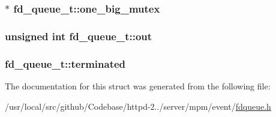 \subsubsection[{\texorpdfstring{one\+\_\+big\+\_\+mutex}{one_big_mutex}}]{ $\ast$ fd\+\_\+queue\+\_\+t\+::one\+\_\+big\+\_\+mutex}\hypertarget{structfd__queue__t_af029904f6cc5ddc0afec5df2fadeaef6}{}\label{structfd__queue__t_af029904f6cc5ddc0afec5df2fadeaef6}
\subsubsection[{\texorpdfstring{out}{out}}]{\setlength{\rightskip}{0pt plus 5cm}unsigned {\bf int} fd\+\_\+queue\+\_\+t\+::out}\hypertarget{structfd__queue__t_a85b9339d9c70a03d3ff95ae92061cf70}{}\label{structfd__queue__t_a85b9339d9c70a03d3ff95ae92061cf70}
\subsubsection[{\texorpdfstring{terminated}{terminated}}]{ fd\+\_\+queue\+\_\+t\+::terminated}\hypertarget{structfd__queue__t_aace4fa4b984ffe25980fed75c97779d2}{}\label{structfd__queue__t_aace4fa4b984ffe25980fed75c97779d2}


The documentation for this struct was generated from the following file\+:\begin{DoxyCompactItemize}
\item 
/usr/local/src/github/\+Codebase/httpd-\/2../server/mpm/event/\hyperlink{event_2fdqueue_8h}{fdqueue.\+h}\end{DoxyCompactItemize}
